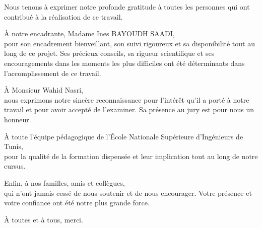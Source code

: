 \documentclass[12pt,a4paper,oneside]{report}
\begin{document}
\begin{center}

Nous tenons à exprimer notre profonde gratitude à toutes les personnes qui ont contribué à la réalisation de ce travail.

\vspace{0.6cm}

À notre encadrante, Madame Ines BAYOUDH SAADI,\\
pour son encadrement bienveillant, son suivi rigoureux et sa disponibilité tout au long de ce projet. Ses précieux conseils, sa rigueur scientifique et ses encouragements dans les moments les plus difficiles ont été déterminants dans l'accomplissement de ce travail.

\vspace{0.6cm}

À Monsieur Wahid Nasri,\\
nous exprimons notre sincère reconnaissance pour l'intérêt qu'il a porté à notre travail et pour avoir accepté de l'examiner. Sa présence au jury est pour nous un honneur.

\vspace{0.6cm}

À toute l'équipe pédagogique de l'École Nationale Supérieure d'Ingénieurs de Tunis,\\
pour la qualité de la formation dispensée et leur implication tout au long de notre cursus.

\vspace{0.6cm}

Enfin, à nos familles, amis et collègues,\\
qui n'ont jamais cessé de nous soutenir et de nous encourager. Votre présence et votre confiance ont été notre plus grande force.

\vspace{0.6cm}

À toutes et à tous, merci.

\end{center}

\clearpage


\clearpage
{}
\setcounter{page}{1}

\tableofcontents

\clearpage
\listoffigures

\clearpage
{}
\setcounter{page}{1}

















\clearpage

\end{document}
